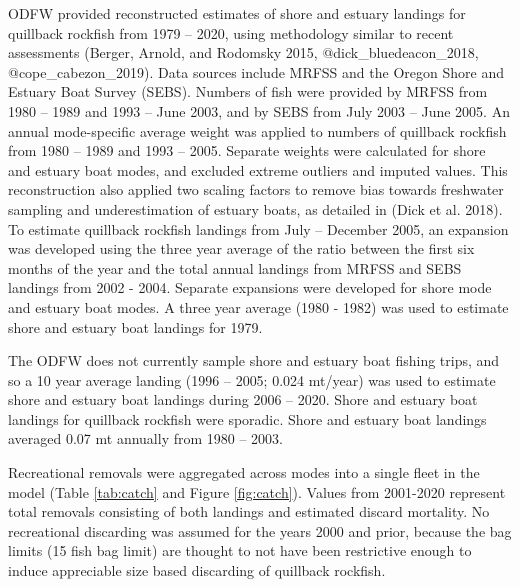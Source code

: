 \documentclass[11pt,
  english,
  a4paper,
]{article}
\begin{document}

ODFW provided reconstructed estimates of shore and estuary landings for quillback rockfish from 1979 -- 2020, using methodology similar to recent assessments {(Berger, Arnold, and Rodomsky 2015, @dick\_bluedeacon\_2018, @cope\_cabezon\_2019)\leavevmode\tagmcend\tagstructend}. Data sources include MRFSS and the Oregon Shore and Estuary Boat Survey (SEBS). Numbers of fish were provided by MRFSS from 1980 -- 1989 and 1993 -- June 2003, and by SEBS from July 2003 -- June 2005. An annual mode-specific average weight was applied to numbers of quillback rockfish from 1980 -- 1989 and 1993 -- 2005. Separate weights were calculated for shore and estuary boat modes, and excluded extreme outliers and imputed values. This reconstruction also applied two scaling factors to remove bias towards freshwater sampling and underestimation of estuary boats, as detailed in {(Dick et al. 2018)\leavevmode\tagmcend\tagstructend}. To estimate quillback rockfish landings from July -- December 2005, an expansion was developed using the three year average of the ratio between the first six months of the year and the total annual landings from MRFSS and SEBS landings from 2002 - 2004. Separate expansions were developed for shore mode and estuary boat modes. A three year average (1980 - 1982) was used to estimate shore and estuary boat landings for 1979.

\leavevmode\tagmcend\tagstructend\par


The ODFW does not currently sample shore and estuary boat fishing trips, and so a 10 year average landing (1996 -- 2005; 0.024 mt/year) was used to estimate shore and estuary boat landings during 2006 -- 2020. Shore and estuary boat landings for quillback rockfish were sporadic. Shore and estuary boat landings averaged 0.07 mt annually from 1980 -- 2003.

\leavevmode\tagmcend\tagstructend\par


Recreational removals were aggregated across modes into a single fleet in the model (Table \ref{tab:catch} and Figure \ref{fig:catch}). Values from 2001-2020 represent total removals consisting of both landings and estimated discard mortality. No recreational discarding was assumed for the years 2000 and prior, because the bag limits (15 fish bag limit) are thought to not have been restrictive enough to induce appreciable size based discarding of quillback rockfish.
\end{document}
